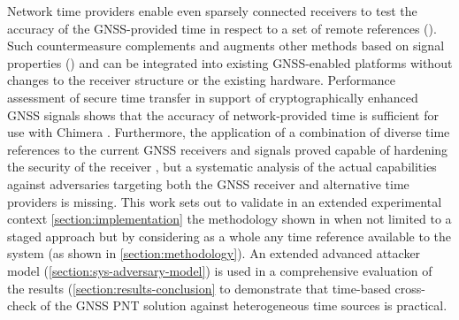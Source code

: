 Network time providers enable even sparsely connected receivers to test the accuracy of the GNSS-provided time in respect to a set of remote references (\cite{spangheroGNSS20,kzmsppPLANS2020, spangheroMPPPLANS23}). Such countermeasure complements and augments other methods based on signal properties (\cite{papadimMilcom2008}) and can be integrated into existing GNSS-enabled platforms without changes to the receiver structure or the existing hardware.  Performance assessment of secure time transfer in support of cryptographically enhanced GNSS signals shows that the accuracy of network-provided time is sufficient for use with Chimera \cite{ODriscol2020}. Furthermore, the application of a combination of diverse time references to the current GNSS receivers and signals proved capable of hardening the security of the receiver \cite{spangheroMPPPLANS23,patentPP:J:2009}, but a systematic analysis of the actual capabilities against adversaries targeting both the GNSS receiver and alternative time providers is missing. This work sets out to validate in an extended experimental context \cref{section:implementation} the methodology shown in \cite{spangheroMPPPLANS23,kzmsppPLANS2020} when not limited to a staged approach but by considering as a whole any time reference available to the system (as shown in \cref{section:methodology}). An extended advanced attacker model (\cref{section:sys-adversary-model}) is used in a comprehensive evaluation of the results (\cref{section:results-conclusion} to demonstrate that time-based cross-check of the GNSS PNT solution against heterogeneous time sources is practical.


